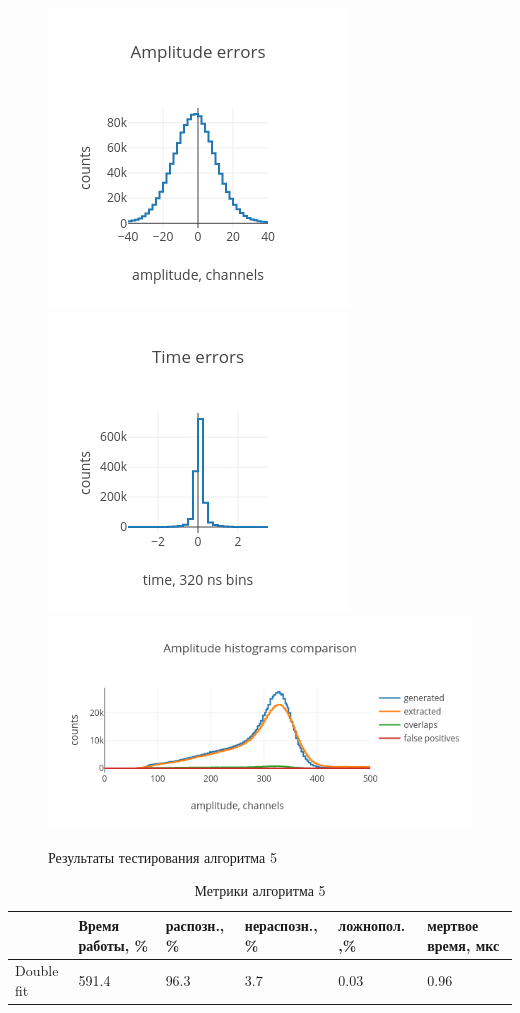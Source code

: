 \documentclass[a4paper,14pt]{extreport}
\begin{document}
\begin{figure}
\centering
	\includegraphics[width=0.40\linewidth]{img/signals/method_5/amps.png} 
    \includegraphics[width=0.40\linewidth]{img/signals/method_5/time.png} \\
    \includegraphics[width=0.80\linewidth]{img/signals/method_5/hists.png}
    \caption{Результаты тестирования алгоритма 5}
    \label{method-5-metrics}
\end{figure}

\begin{table}
\centering
    \begin{tabular}{|p{}|p{}|p{}|p{}|p{}|p{}|}
        \hline
         & Время работы, \% & распозн., \% & нераспозн., \% & ложнопол. ,\% & мертвое время, мкс \\
        \hline
        Double fit & 591.4 & 96.3 & 3.7 & 0.03 & 0.96 \\ 
        \hline
    \end{tabular}
    \caption{Метрики алгоритма 5}
    \label{tbl:methods-compare-3}
\end{table}
\end{document}

